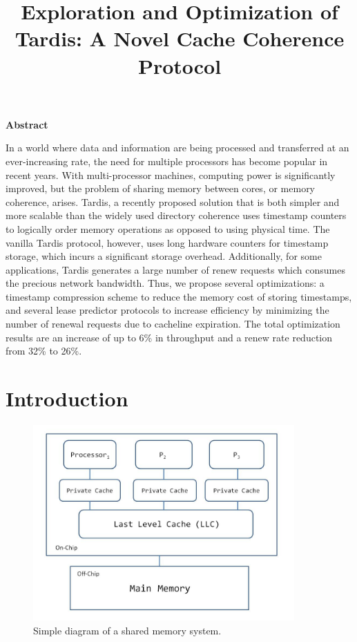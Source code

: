 \documentclass[12pt]{article}
\title{Exploration and Optimization of Tardis: A Novel Cache Coherence Protocol}
\date{}
\begin{document}
	\maketitle
\begin{center}
\textbf{Abstract}
\end{center}

\justify
In a world where data and information are being processed and transferred at an ever-increasing rate, the need for multiple processors has become popular in recent years. With multi-processor machines, computing power is significantly improved, but the problem of sharing memory between cores, or memory coherence, arises. Tardis, a recently proposed solution that is both simpler and more scalable than the widely used directory coherence uses timestamp counters to logically order memory operations as opposed to using physical time. The vanilla Tardis protocol, however, uses long hardware counters for timestamp storage, which incurs a significant storage overhead. Additionally, for some applications, Tardis generates a large number of renew requests which consumes the precious network bandwidth. Thus, we propose several optimizations: a timestamp compression scheme to reduce the memory cost of storing timestamps, and several lease predictor protocols to increase efficiency by minimizing the number of renewal requests due to cacheline expiration. The total optimization results are an increase of up to 6\% in throughput and a renew rate reduction from 32\% to 26\%.



\section{Introduction}

\begin{figure}
\begin{center}
  \includegraphics[width=10cm]{distributed_system.JPG}
  \caption{Simple diagram of a shared memory system.}
  \label{fig:distributed}
\end{center}
\end{figure}
\end{document}

